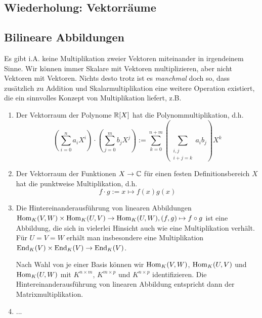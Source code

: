 
\subsection{Wiederholung: Vektorräume}


\subsection{Bilineare Abbildungen}

\begin{remark}
Es gibt i.A. keine Multiplikation zweier Vektoren miteinander in irgendeinem Sinne. Wir können immer Skalare mit Vektoren multiplizieren, aber nicht Vektoren mit Vektoren. Nichts desto trotz ist es \emph{manchmal} doch so, dass zusätzlich zu Addition und Skalarmultiplikation eine weitere Operation existiert, die ein sinnvolles Konzept von Multiplikation liefert, z.B.
\begin{enumerate}
	\item Der Vektorraum der Polynome $\mathbb{R}[X]$ hat die Polynommultiplikation, d.h.
    \[\left(\sum_{i=0}^n a_i X^i\right) \cdot \left(\sum_{j=0}^m b_j X^j\right) := \sum_{k=0}^{n+m} (\sum_{\substack{i,j \\ i+j=k}} a_i b_j) X^k\]
	\item Der Vektorraum der Funktionen $X\to\mathbb{C}$ für einen festen Definitionsbereich $X$ hat die punktweise Multiplikation, d.h.
    \[f\cdot g := x\mapsto f(x)g(x)\]
	\item Die Hintereinanderausführung von linearen Abbildungen $\operatorname{Hom}_K(V,W) \times \operatorname{Hom}_K(U,V) \to \operatorname{Hom}_K(U,W), (f,g) \mapsto f\circ g$ ist eine Abbildung, die sich in vielerlei Hinsicht auch wie eine Multiplikation verhält. Für $U=V=W$ erhält man insbesondere eine Multiplikation $\operatorname{End}_K(V) \times \operatorname{End}_K(V) \to \operatorname{End}_K(V)$.
    
    Nach Wahl von je einer Basis können wir $\operatorname{Hom}_K(V,W)$, $\operatorname{Hom}_K(U,V)$ und $\operatorname{Hom}_K(U,W)$ mit $K^{n\times m}$, $K^{m\times p}$ und $K^{n\times p}$ identifizieren. Die Hintereinanderausführung von linearen Abbildung entspricht dann der Matrixmultiplikation.
    \item ...
\end{enumerate}

\end{remark}

